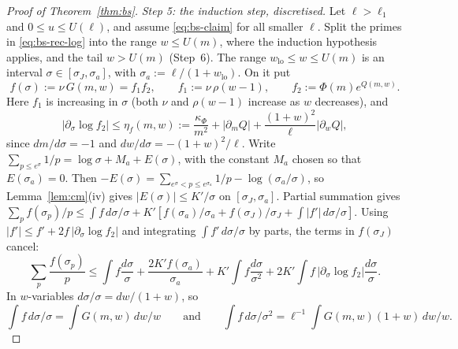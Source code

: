 \begin{proof}[Proof of Theorem~\ref{thm:bs}]
\emph{Step 5: the induction step, discretised.} Let $\ell>\ell_1$ and $0\le u\le U(\ell)$, and assume
\eqref{eq:bs-claim} for all smaller $\ell$. Split the primes in \eqref{eq:bs-rec-log} into the range $w\le U(m)$, where
the induction hypothesis applies, and the tail $w>U(m)$ (Step~6). The range $w_{\mathrm{lo}}\le w\le U(m)$ is an interval
$\sigma\in[\sigma_J,\sigma_a]$, with $\sigma_a:=\ell/(1+w_{\mathrm{lo}})$. On it put
\[
  f(\sigma):=\nu\,G(m,w)=f_1f_2,\qquad f_1:=\nu\,\rho(w-1),\qquad f_2:=\Phi(m)e^{Q(m,w)} .
\]
Here $f_1$ is increasing in $\sigma$ (both $\nu$ and $\rho(w-1)$ increase as $w$ decreases), and
\[
  |\partial_\sigma\log f_2|\le\eta_f(m,w):=\frac{\kappa_\Phi}{m^2}+|\partial_mQ|+\frac{(1+w)^2}{\ell}|\partial_wQ|,
\]
since $dm/d\sigma=-1$ and $dw/d\sigma=-(1+w)^2/\ell$. Write $\sum_{p\le e^\sigma}1/p=\log\sigma+M_a+E(\sigma)$, with the
constant $M_a$ chosen so that $E(\sigma_a)=0$. Then $-E(\sigma)=\sum_{e^\sigma<p\le e^{\sigma_a}}1/p-\log(\sigma_a/\sigma)$, so
Lemma~\ref{lem:cm}(iv) gives $|E(\sigma)|\le K'/\sigma$ on $[\sigma_J,\sigma_a]$. Partial summation gives
$\sum_pf(\sigma_p)/p\le\int f\,d\sigma/\sigma+K'[f(\sigma_a)/\sigma_a+f(\sigma_J)/\sigma_J+\int|f'|\,d\sigma/\sigma]$.
Using $|f'|\le f'+2f\,|\partial_\sigma\log f_2|$ and integrating $\int f'\,d\sigma/\sigma$ by parts, the terms in
$f(\sigma_J)$ cancel:
\begin{equation}\label{eq:bs-D1}
  \sum_p\frac{f(\sigma_p)}p\le\int f\frac{d\sigma}\sigma+\frac{2K'f(\sigma_a)}{\sigma_a}+K'\int f\frac{d\sigma}{\sigma^2}
  +2K'\int f\,|\partial_\sigma\log f_2|\frac{d\sigma}\sigma .
\end{equation}
In $w$-variables $d\sigma/\sigma=dw/(1+w)$, so
\[
  \int f\,d\sigma/\sigma=\int G(m,w)\,dw/w\qquad\text{and}\qquad\int f\,d\sigma/\sigma^2=\ell^{-1}\int G(m,w)(1+w)\,dw/w.
\]


\end{proof}
